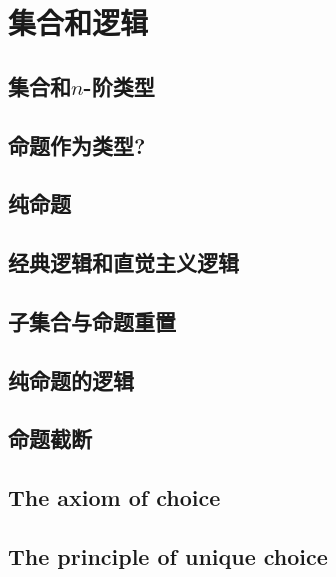 \chapter{集合和逻辑}
\label{cha:logic}


\section{集合和\texorpdfstring{$n$}{n}-阶类型}
\label{sec:basics-sets}


\section{命题作为类型?}
\label{subsec:pat?}


\section{纯命题}
\label{subsec:hprops}


\section{经典逻辑和直觉主义逻辑}
\label{sec:intuitionism}


\section{子集合与命题重置}
\label{subsec:prop-subsets}


\section{纯命题的逻辑}
\label{subsec:logic-hprop}


\section{命题截断}
\label{subsec:prop-trunc}


\section{The axiom of choice}
\label{sec:axiom-choice}


\section{The principle of unique choice}
\label{sec:unique-choice}


